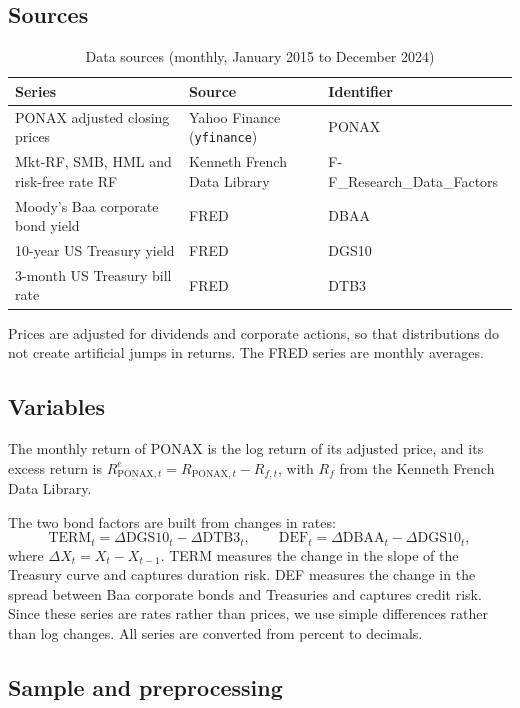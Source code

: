 \documentclass[11pt,a4paper]{article}
\begin{document}
\subsection{Sources}

\begin{table}[H]
\centering
\caption{Data sources (monthly, January 2015 to December 2024)}
\footnotesize
\begin{tabular}{lll}
\toprule
Series & Source & Identifier \\
\midrule
PONAX adjusted closing prices & Yahoo Finance (\texttt{yfinance}) & PONAX \\
Mkt-RF, SMB, HML and risk-free rate RF & Kenneth French Data Library & F-F\_Research\_Data\_Factors \\
Moody's Baa corporate bond yield & FRED & DBAA \\
10-year US Treasury yield & FRED & DGS10 \\
3-month US Treasury bill rate & FRED & DTB3 \\
\bottomrule
\end{tabular}
\end{table}

Prices are adjusted for dividends and corporate actions, so that distributions do not create artificial jumps in returns. The FRED series are monthly averages.

\subsection{Variables}

The monthly return of PONAX is the log return of its adjusted price, and its excess return is $R^e_{\text{PONAX},t} = R_{\text{PONAX},t} - R_{f,t}$, with $R_f$ from the Kenneth French Data Library.

The two bond factors are built from changes in rates:
\[
\text{TERM}_t = \Delta \text{DGS10}_t - \Delta \text{DTB3}_t,
\qquad
\text{DEF}_t = \Delta \text{DBAA}_t - \Delta \text{DGS10}_t,
\]
where $\Delta X_t = X_t - X_{t-1}$.
TERM measures the change in the slope of the Treasury curve and captures duration risk. DEF measures the change in the spread between Baa corporate bonds and Treasuries and captures credit risk. Since these series are rates rather than prices, we use simple differences rather than log changes. All series are converted from percent to decimals.

\subsection{Sample and preprocessing}
\end{document}
